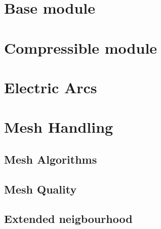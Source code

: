\documentclass[a4paper,10pt,twoside]{csdoc}
\begin{document}
\part{Base module}



















\part{Compressible module}
\setcounter{chapter}{0}
\setcounter{section}{0}
\setcounter{equation}{0}
\setcounter{figure}{0}







\part{Electric Arcs}
\setcounter{chapter}{0}
\setcounter{section}{0}
\setcounter{equation}{0}
\setcounter{figure}{0}



\setcounter{section}{0}
\setcounter{equation}{0}
\setcounter{figure}{0}

\part{Mesh Handling}
\setcounter{section}{0}
\setcounter{equation}{0}
\setcounter{figure}{0}

\chapter{Mesh Algorithms}\label{chapter:meshalgo}


\chapter{Mesh Quality}\label{chapter:meshquality}


\chapter{Extended neigbourhood}\label{chapter:ext_neighbor}

\end{document}
